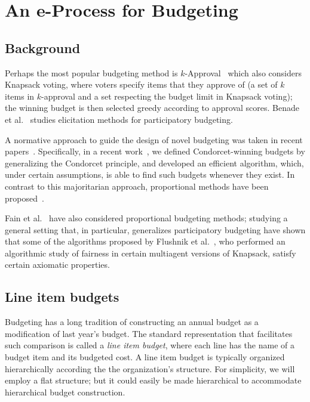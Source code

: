 \documentclass{llncs}
\begin{document}
\section{An e-Process for Budgeting}
\label{section:e-process budgeting}


\subsection{Background}

Perhaps the most popular budgeting method is $k$-Approval~\cite{goel2015knapsack} which also considers Knapsack voting, where voters specify items that they approve of (a set of $k$ items in $k$-approval and a set respecting the budget limit in Knapsack voting); the winning budget is then selected greedy according to approval scores.
%
Benade et al.~\cite{benade2017preference} studies elicitation methods for participatory budgeting.

A normative approach to guide the design of novel budgeting was taken in recent papers~\cite{condorcetbudgeting,aussieone}.
Specifically, in a recent work~\cite{condorcetbudgeting}, we defined Condorcet-winning budgets by generalizing the Condorcet principle, and developed an efficient algorithm, which, under certain assumptions, is able to find such budgets whenever they exist.
%
In contrast to this majoritarian approach, proportional methods have been proposed~\cite{aussieone}.

Fain et al.~\cite{fain2016core} have also considered proportional budgeting methods;
studying a general setting that, in particular, generalizes participatory budgeting have shown that some of the algorithms proposed by Flushnik et al.~\cite{fluschnik2017fair},
who performed an algorithmic study of fairness in certain multiagent versions of Knapsack,
satisfy certain axiomatic properties.


\subsection{Line item budgets}

Budgeting has a long tradition of constructing an annual budget as a modification of last year's budget.  The standard representation that facilitates such comparison is called a \emph{line item budget}, where each line has the name of a budget item and its budgeted cost.  A line item budget is typically organized hierarchically according the the organization's structure.  For simplicity, we will employ a flat structure; but it could easily be made hierarchical to accommodate hierarchical budget construction.
\end{document}
